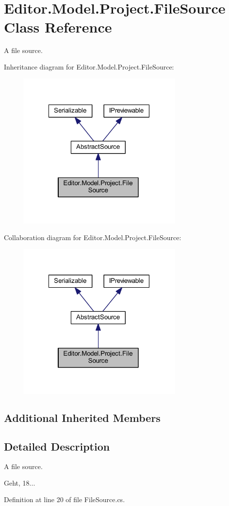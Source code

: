 \section{Editor.\-Model.\-Project.\-File\-Source Class Reference}
\label{class_editor_1_1_model_1_1_project_1_1_file_source}


A file source.  




Inheritance diagram for Editor.\-Model.\-Project.\-File\-Source\-:
\nopagebreak
\begin{figure}[H]
\begin{center}
\leavevmode
\includegraphics[width=235pt]{class_editor_1_1_model_1_1_project_1_1_file_source__inherit__graph}
\end{center}
\end{figure}


Collaboration diagram for Editor.\-Model.\-Project.\-File\-Source\-:
\nopagebreak
\begin{figure}[H]
\begin{center}
\leavevmode
\includegraphics[width=235pt]{class_editor_1_1_model_1_1_project_1_1_file_source__coll__graph}
\end{center}
\end{figure}
\subsection*{Additional Inherited Members}


\subsection{Detailed Description}
A file source. 

Geht, 18... 

Definition at line 20 of file File\-Source.\-cs.


